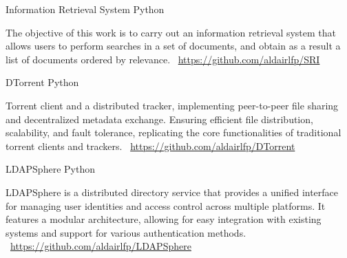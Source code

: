 \documentclass[]{awesome-cv}
\begin{document}
\begin{cventries}
	\vspace{-3mm}
	\cventry
	{}
	{Information Retrieval System \vspace{-5mm}}
	{Python \vspace{-5mm}}
	{}
	{\begin{cvsectionnormaltext}
			\item{The objective of this work is to carry out an information retrieval system that allows users to perform searches in a set
			            of documents, and obtain as a result a list of documents ordered by relevance.
			            \newline \faLink\ \href{https://github.com/aldairlfp/SRI}{https://github.com/aldairlfp/SRI}}
		\end{cvsectionnormaltext}}

	\vspace{-3mm}
	\cventry
	{}
	{DTorrent \vspace{-5mm}}
	{Python \vspace{-5mm}}
	{}
	{\begin{cvsectionnormaltext}
			\item{Torrent client and a distributed tracker, implementing peer-to-peer file sharing and decentralized metadata exchange.
			            Ensuring efficient file distribution, scalability, and fault tolerance, replicating the core functionalities of traditional
			            torrent clients and trackers.
			            \newline \faLink\ \href{https://github.com/aldairlfp/DTorrent}{https://github.com/aldairlfp/DTorrent}}
		\end{cvsectionnormaltext}}

	\vspace{-3mm}
	\cventry
	{}
	{LDAPSphere \vspace{-5mm}}
	{Python \vspace{-5mm}}
	{}
	{\begin{cvsectionnormaltext}
			\item{LDAPSphere is a distributed directory service that provides a unified interface for managing user identities and access control across multiple platforms.
			            It features a modular architecture, allowing for easy integration with existing systems and support for various authentication methods.
			            \newline \faLink\ \href{https://github.com/aldairlfp/LDAPSphere}{https://github.com/aldairlfp/LDAPSphere}}
		\end{cvsectionnormaltext}}

	\vspace{-5mm}

\end{cventries}
\end{document}
